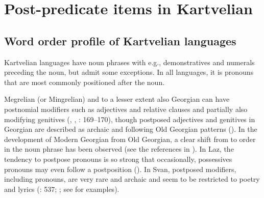 \documentclass[output=paper,colorlinks,citecolor=brown,draftmode]{langscibook}
\begin{document}
\section{Post-predicate items in Kartvelian}\label{EC:ss:2}

\subsection{Word order profile of Kartvelian languages}\label{EC:ss:2.1}

Kartvelian languages have  noun phrases with e.g., demonstratives and numerals preceding the noun, but admit some exceptions. In all languages, it is  pronouns that are most commonly positioned after the noun.

Megrelian (or Mingrelian) and to a lesser extent also Georgian can have postnomial modifiers such as adjectives and relative clauses and partially also modifying genitives (\citealt{aronson_modern_1991}, \citealt{harris_mingrelian_1991}, \citealt{pourtskhvanidze_fokuspartikeln_2015}: 169--170), though postposed adjectives and genitives in Georgian are described as archaic and following Old Georgian patterns (\citealt{testelets_wordKartvelian_1998}). In the development of Modern Georgian from Old Georgian, a clear shift from  to  order in the noun phrase has been observed (see the references in \citealt{testelets_wordKartvelian_1998}). In Laz, the tendency to postpose  pronouns is so strong that occasionally, possessives pronouns may even follow a postposition (\citealt{holisky_laz_1991}). In Svan, postposed modifiers, including  pronouns, are very rare and archaic and seem to be restricted to poetry and lyrics (\citealt{schmidt_svan_1991}: 537; \citealt{tuite_short_1998}; see \citealt{testelets_wordKartvelian_1998} for examples). 
\end{document}
